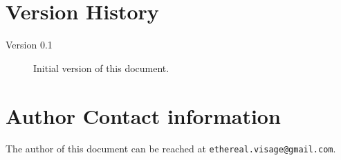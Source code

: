 \appendix

\chapter{Version History}
\begin{description}
 \item[Version 0.1] Initial version of this document.
\end{description}

\chapter{Author Contact information}
The author of this document can be reached at \texttt{ethereal.visage@gmail.com}.
